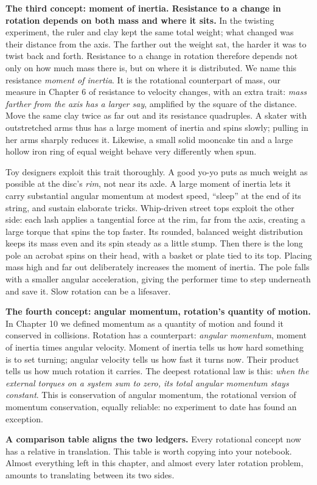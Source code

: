 \begin{mainline}
\textbf{The third concept: moment of inertia. Resistance to a change in rotation depends on both mass and where it sits.} In the twisting experiment, the ruler and clay kept the same total weight; what changed was their distance from the axis. The farther out the weight sat, the harder it was to twist back and forth. Resistance to a change in rotation therefore depends not only on how much mass there is, but on where it is distributed. We name this resistance \emph{moment of inertia}. It is the rotational counterpart of mass, our measure in Chapter 6 of resistance to velocity changes, with an extra trait: \emph{mass farther from the axis has a larger say}, amplified by the square of the distance. Move the same clay twice as far out and its resistance quadruples. A skater with outstretched arms thus has a large moment of inertia and spins slowly; pulling in her arms sharply reduces it. Likewise, a small solid mooncake tin and a large hollow iron ring of equal weight behave very differently when spun.

Toy designers exploit this trait thoroughly. A good yo-yo puts as much weight as possible at the disc's \emph{rim}, not near its axle. A large moment of inertia lets it carry substantial angular momentum at modest speed, ``sleep'' at the end of its string, and sustain elaborate tricks. Whip-driven street tops exploit the other side: each lash applies a tangential force at the rim, far from the axis, creating a large torque that spins the top faster. Its rounded, balanced weight distribution keeps its mass even and its spin steady as a little stump. Then there is the long pole an acrobat spins on their head, with a basket or plate tied to its top. Placing mass high and far out deliberately increases the moment of inertia. The pole falls with a smaller angular acceleration, giving the performer time to step underneath and save it. Slow rotation can be a lifesaver.

\textbf{The fourth concept: angular momentum, rotation's quantity of motion.} In Chapter 10 we defined momentum as a quantity of motion and found it conserved in collisions. Rotation has a counterpart: \emph{angular momentum}, moment of inertia times angular velocity. Moment of inertia tells us how hard something is to set turning; angular velocity tells us how fast it turns now. Their product tells us how much rotation it carries. The deepest rotational law is this: \emph{when the external torques on a system sum to zero, its total angular momentum stays constant}. This is conservation of angular momentum, the rotational version of momentum conservation, equally reliable: no experiment to date has found an exception.

\textbf{A comparison table aligns the two ledgers.} Every rotational concept now has a relative in translation. This table is worth copying into your notebook. Almost everything left in this chapter, and almost every later rotation problem, amounts to translating between its two sides.
\end{mainline}

